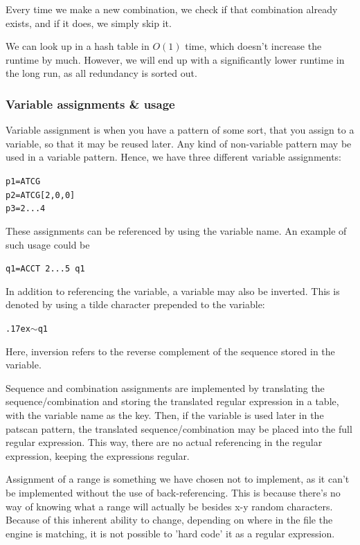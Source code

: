 \documentclass[12pt]{article}
\theoremstyle{definition}
\begin{document}
Every time we make a new combination, we check if that combination already exists, and if it does, we simply skip it.

We can look up in a hash table in $O(1)$ time, which doesn't increase the runtime by much. However, we will end up with a significantly lower runtime in the long run, as all redundancy is sorted out.

\subsubsection{Variable assignments \& usage}

Variable assignment is when you have a pattern of some sort, that you assign to a variable, so that it may be reused later. Any kind of non-variable pattern may be used in a variable pattern. Hence, we have three different variable assignments:

\texttt{p1=ATCG} \\
\texttt{p2=ATCG[2,0,0]} \\
\texttt{p3=2...4}

These assignments can be referenced by using the variable name. An example of such usage could be

\texttt{q1=ACCT 2...5 q1}

In addition to referencing the variable, a variable may also be inverted. This is denoted by using a tilde character prepended to the variable:

\texttt{{\raise.17ex\hbox{$\scriptstyle\mathtt{\sim}$}}q1}

Here, inversion refers to the reverse complement of the sequence stored in the variable.

Sequence and combination assignments are implemented by translating the sequence/combination and storing the translated regular expression in a table, with the variable name as the key. Then, if the variable is used later in the patscan pattern, the translated sequence/combination may be placed into the full regular expression. This way, there are no actual referencing in the regular expression, keeping the expressions regular.

Assignment of a range is something we have chosen not to implement, as it can't be implemented without the use of back-referencing. This is because there's no way of knowing what a range will actually be besides x-y random characters. Because of this inherent ability to change, depending on where in the file the engine is matching, it is not possible to 'hard code' it as a regular expression.
\end{document}
